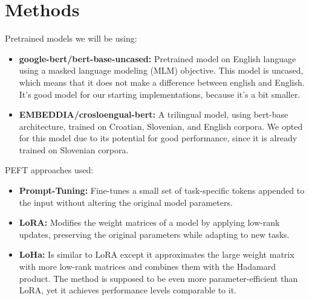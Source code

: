 \documentclass[fleqn,moreauthors,10pt]{ds_report}
\begin{document}

\section*{Methods}
    
    Pretrained models we will be using:
    \begin{itemize}
        \item \textbf{google-bert/bert-base-uncased:} Pretrained mo\-del on English language using a masked language modeling (MLM) objective. This model is uncased, which means that it does not make a difference between english and English. It's good model for our starting implementations, because it's a bit smaller.
        \item \textbf{EMBEDDIA/crosloengual-bert:} A trilingual mo\-del, using bert-base architecture, trained on Croatian, Slovenian, and English corpora. We opted for this model due to its potential for good performance, since it is already trained on Slovenian corpora.
    \end{itemize}
    
    PEFT approaches used: 
    \begin{itemize}
        \item \textbf{Prompt-Tuning:} Fine-tunes a small set of task-specific tokens appended to the input without altering the original model parameters.
        \item \textbf{LoRA:} Modifies the weight matrices of a model by applying low-rank updates, preserving the original parameters while adapting to new tasks.
        \item \textbf{LoHa:} Is similar to LoRA except it approximates the large weight matrix with more low-rank matrices and combines them with the Hadamard product. The method is supposed to be even more parameter-efficient than LoRA, yet it achieves performance levels comparable to it.
     \end{itemize}
    
\end{document}
